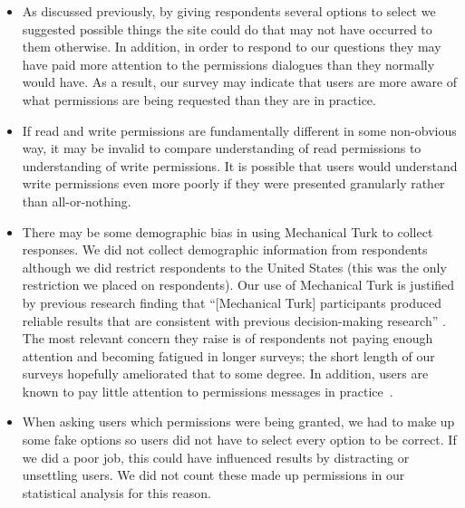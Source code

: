 \documentclass{sig-alternate}
\begin{document}
\begin{itemize}
  \item As discussed previously, by giving respondents several options to select we suggested possible things the site could do that may not have occurred to them otherwise. In addition, in order to respond to our questions they may have paid more attention to the permissions dialogues than they normally would have. As a result, our survey may indicate that users are more aware of what permissions are being requested than they are in practice.
  \item If read and write permissions are fundamentally different in some non-obvious way, it may be invalid to compare understanding of read permissions to understanding of write permissions. It is possible that users would understand write permissions even more poorly if they were presented granularly rather than all-or-nothing.
  \item There may be some demographic bias in using Mechanical Turk to collect responses. We did not collect demographic information from respondents although we did restrict respondents to the United States (this was the only restriction we placed on respondents). Our use of Mechanical Turk is justified by previous research finding that ``[Mechanical Turk] participants produced reliable results that are consistent with previous decision-making research'' \cite{mturkreliability}. The most relevant concern they raise is of respondents not paying enough attention and becoming fatigued in longer surveys; the short length of our surveys hopefully ameliorated that to some degree. In addition, users are known to pay little attention to permissions messages in practice~\cite{egelman}.
  \item When asking users which permissions were being granted, we had to make up some fake options so users did not have to select every option to be correct. If we did a poor job, this could have influenced results by distracting or unsettling users. We did not count these made up permissions in our statistical analysis for this reason.
\end{itemize}



\end{document}
